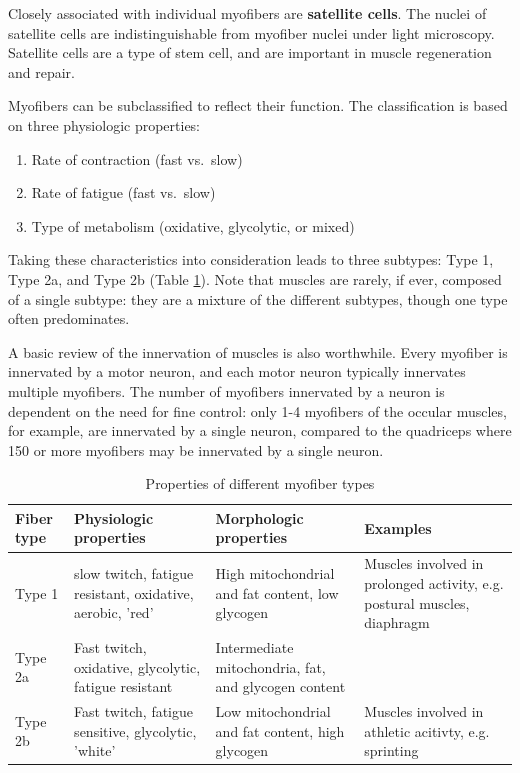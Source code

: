 \documentclass[openany]{book}
\providecommand{\tightlist}{%
  \setlength{\itemsep}{0pt}\setlength{\parskip}{0pt}}
\begin{document}
Closely associated with individual myofibers are \textbf{satellite
cells}. The nuclei of satellite cells are indistinguishable from
myofiber nuclei under light microscopy. Satellite cells are a type of
stem cell, and are important in muscle regeneration and repair.

Myofibers can be subclassified to reflect their function. The
classification is based on three physiologic properties:

\begin{enumerate}
\def\labelenumi{\arabic{enumi}.}
\tightlist
\item
  Rate of contraction (fast vs.~slow)
\item
  Rate of fatigue (fast vs.~slow)
\item
  Type of metabolism (oxidative, glycolytic, or mixed)
\end{enumerate}

Taking these characteristics into consideration leads to three subtypes:
Type 1, Type 2a, and Type 2b (Table \ref{tab:muscle-type}). Note that
muscles are rarely, if ever, composed of a single subtype: they are a
mixture of the different subtypes, though one type often predominates.

A basic review of the innervation of muscles is also worthwhile. Every
myofiber is innervated by a motor neuron, and each motor neuron
typically innervates multiple myofibers. The number of myofibers
innervated by a neuron is dependent on the need for fine control: only
1-4 myofibers of the occular muscles, for example, are innervated by a
single neuron, compared to the quadriceps where 150 or more myofibers
may be innervated by a single neuron.

\begin{table}[!h]

\caption{\label{tab:muscle-type}Properties of different myofiber types}
\centering
\begin{tabular}{l>{\raggedright\arraybackslash}p{10em}>{\raggedright\arraybackslash}p{10em}>{\raggedright\arraybackslash}p{10em}}
\toprule
Fiber type & Physiologic properties & Morphologic properties & Examples\\
\midrule
Type 1 & slow twitch, fatigue resistant, oxidative, aerobic, 'red' & High mitochondrial and fat content, low glycogen & Muscles involved in prolonged activity, e.g. postural muscles, diaphragm\\
Type 2a & Fast twitch, oxidative, glycolytic, fatigue resistant & Intermediate mitochondria, fat, and glycogen content & \\
Type 2b & Fast twitch, fatigue sensitive, glycolytic, 'white' & Low mitochondrial and fat content, high glycogen & Muscles involved in athletic acitivty, e.g. sprinting\\
\bottomrule
\end{tabular}
\end{table}
\end{document}

